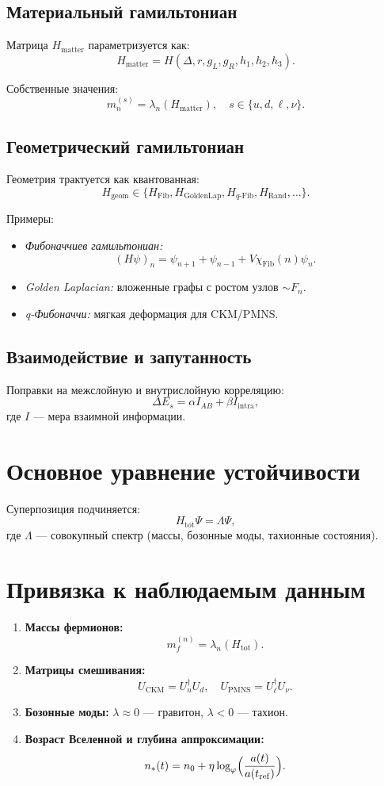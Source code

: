 \documentclass[12pt,a4paper]{article}
\begin{document}
\subsection{Материальный гамильтониан}
Матрица $H_{\mathrm{matter}}$ параметризуется как:
\[
H_{\mathrm{matter}} = H(\Delta, r, g_L, g_R, h_1,h_2,h_3).
\]

Собственные значения:
\[
m^{(s)}_n = \lambda_n(H_{\mathrm{matter}}), \quad s \in \{u, d, \ell, \nu\}.
\]

\subsection{Геометрический гамильтониан}
Геометрия трактуется как квантованная:
\[
H_{\mathrm{geom}} \in \{ H_{\mathrm{Fib}}, H_{\mathrm{GoldenLap}}, H_{q\text{-Fib}}, H_{\text{Rand}}, \dots \}.
\]

Примеры:
\begin{itemize}
    \item \emph{Фибоначчиев гамильтониан:}
    \[
    (H\psi)_n = \psi_{n+1} + \psi_{n-1} + V\chi_{\text{Fib}}(n)\psi_n.
    \]
    \item \emph{Golden Laplacian:} вложенные графы с ростом узлов $\sim F_n$.
    \item \emph{q-Фибоначчи:} мягкая деформация для CKM/PMNS.
\end{itemize}

\subsection{Взаимодействие и запутанность}
Поправки на межслойную и внутрислойную корреляцию:
\[
\Delta E_s = \alpha I_{AB} + \beta I_{\mathrm{intra}},
\]
где $I$ — мера взаимной информации.

\section{Основное уравнение устойчивости}
Суперпозиция подчиняется:
\[
H_{\mathrm{tot}} \Psi = \Lambda \Psi ,
\]
где $\Lambda$ — совокупный спектр (массы, бозонные моды, тахионные состояния).

\section{Привязка к наблюдаемым данным}
\begin{enumerate}
    \item \textbf{Массы фермионов:}
    \[
    m_f^{(n)} = \lambda_n(H_{\mathrm{tot}}).
    \]
    \item \textbf{Матрицы смешивания:}
    \[
    U_{\mathrm{CKM}} = U_u^\dagger U_d, \quad U_{\mathrm{PMNS}} = U_\ell^\dagger U_\nu.
    \]
    \item \textbf{Бозонные моды:}  
    \(\lambda \approx 0\) — гравитон, \(\lambda < 0\) — тахион.
    \item \textbf{Возраст Вселенной и глубина аппроксимации:}
    \[
    n_*(t) = n_0 + \eta \log_{\varphi}\!\Big(\frac{a(t)}{a(t_{\rm ref})}\Big).
    \]
\end{enumerate}
\end{document}
